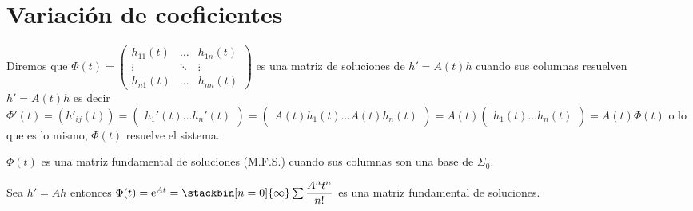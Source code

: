 \section{Variación de coeficientes}

\begin{defi}
Diremos que $\Phi(t) = \begin{pmatrix}
h_{11}(t) & \hdots & h_{1n}(t) \\
\vdots & \ddots & \vdots \\
h_{n1}(t) & \hdots & h_{nn}(t)
\end{pmatrix}$ es una matriz de soluciones de $h' = A(t)h$ cuando sus columnas resuelven $h' = A(t)h$ es decir $\Phi'(t)= (h'_{ij}(t))= \begin{pmatrix} h_1'(t) \hdots	 h_n'(t) \end{pmatrix} = \begin{pmatrix} A(t)h_1(t) \hdots A(t)h_n(t) \end{pmatrix}= A(t)\begin{pmatrix} h_1(t) \hdots h_n(t) \end{pmatrix}=A(t)\Phi(t)$ o lo que es lo mismo, $\Phi(t)$ resuelve el sistema.
\end{defi}

\begin{defi}
$\Phi(t)$ es una matriz fundamental de soluciones (M.F.S.) cuando sus columnas son una base de $\Sigma_0$.
\end{defi}

\begin{ejem}
Sea $h'=Ah$ entonces $\Phi(t)= \e^{At}=\stackbin[n=0]{\infty}\sum\dfrac{A^nt^n}{n!}$ es una matriz fundamental de soluciones.
\end{ejem}

